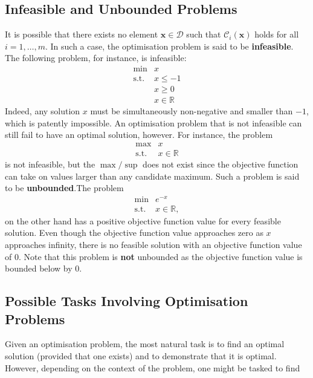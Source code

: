 \subsection{Infeasible and Unbounded Problems}
It is possible that there exists no element
\(\mathbf{x} \in \mathcal{D}\) such that \(\mathcal{C}_i(\mathbf{x})\)
holds for all \(i = 1,\ldots,m\). In such a case, the optimisation
problem is said to be \textbf{infeasible}. \newl The following problem, for instance, is
infeasible: \[\begin{array}{rl}
\min & x \\
\mbox{s.t.}
 & x \leq -1 \\
 & x \geq 0 \\
 & x \in \mathbb{R}
\end{array}\]
Indeed, any solution $x$ must be simultaneously non-negative and smaller than $-1$, which is patently impossible. \newl An optimisation problem that is not infeasible can still fail to have an optimal
solution, however. For instance, the problem \[\begin{array}{rl}
\max & x \\
\mbox{s.t.} &
x \in \mathbb{R}
\end{array}\] is not infeasible, but the $\max/\sup$ does not exist since the  objective function can take on values larger than any candidate maximum. Such a problem is said to be  \textbf{unbounded}.\newl The problem \[\begin{array}{rl}
\min & e^{-x} \\
\mbox{s.t.} & 
x \in \mathbb{R},
\end{array}\] on the other hand has a positive objective function value for every feasible
solution. Even though the objective function value approaches zero as
\(x\) approaches infinity, there is no feasible solution with an objective
function value of 0. Note that this problem is \textbf{not} unbounded as
the objective function value is bounded below by 0.
\subsection{Possible Tasks Involving Optimisation Problems}
Given an optimisation problem, the most natural task is to find an
optimal solution (provided that one exists) and to demonstrate that it is
optimal. However, depending on the context of the problem, one might be
tasked to find

